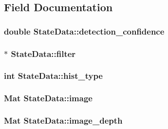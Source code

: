 \subsection{Field Documentation}
\hypertarget{classStateData_abe87d63070a9fc98cd9f1475495725e6}{
\subsubsection[{detection\-\_\-confidence}]{\setlength{\rightskip}{0pt plus 5cm}double State\-Data\-::detection\-\_\-confidence}}\label{classStateData_abe87d63070a9fc98cd9f1475495725e6}
\hypertarget{classStateData_a42c35fd351a6634b67fd1fd2f5a09cf4}{
\subsubsection[{filter}]{$\ast$ State\-Data\-::filter}}\label{classStateData_a42c35fd351a6634b67fd1fd2f5a09cf4}
\hypertarget{classStateData_a14b4b6d403b4517d7102f49a501d51ed}{
\subsubsection[{hist\-\_\-type}]{\setlength{\rightskip}{0pt plus 5cm}int State\-Data\-::hist\-\_\-type}}\label{classStateData_a14b4b6d403b4517d7102f49a501d51ed}
\hypertarget{classStateData_ab1a1e2be2b9a55c78bc579024d30cf64}{
\subsubsection[{image}]{\setlength{\rightskip}{0pt plus 5cm}Mat State\-Data\-::image}}\label{classStateData_ab1a1e2be2b9a55c78bc579024d30cf64}
\hypertarget{classStateData_a662c82a423f855845f2be8700af72817}{
\subsubsection[{image\-\_\-depth}]{\setlength{\rightskip}{0pt plus 5cm}Mat State\-Data\-::image\-\_\-depth}}\label{classStateData_a662c82a423f855845f2be8700af72817}
